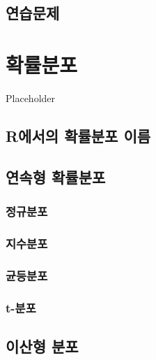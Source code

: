 \documentclass[
]{book}
\begin{document}
\hypertarget{uxc5f0uxc2b5uxbb38uxc81c-4}{%
\section{연습문제}\label{uxc5f0uxc2b5uxbb38uxc81c-4}}

\hypertarget{chapter-distribution}{%
\chapter{확률분포}\label{chapter-distribution}}

Placeholder

\hypertarget{ruxc5d0uxc11cuxc758-uxd655uxb960uxbd84uxd3ec-uxc774uxb984}{%
\section{R에서의 확률분포 이름}\label{ruxc5d0uxc11cuxc758-uxd655uxb960uxbd84uxd3ec-uxc774uxb984}}

\hypertarget{uxc5f0uxc18duxd615-uxd655uxb960uxbd84uxd3ec}{%
\section{연속형 확률분포}\label{uxc5f0uxc18duxd615-uxd655uxb960uxbd84uxd3ec}}

\hypertarget{uxc815uxaddcuxbd84uxd3ec}{%
\subsection{정규분포}\label{uxc815uxaddcuxbd84uxd3ec}}

\hypertarget{uxc9c0uxc218uxbd84uxd3ec}{%
\subsection{지수분포}\label{uxc9c0uxc218uxbd84uxd3ec}}

\hypertarget{uxade0uxb4f1uxbd84uxd3ec}{%
\subsection{균등분포}\label{uxade0uxb4f1uxbd84uxd3ec}}

\hypertarget{t-uxbd84uxd3ec}{%
\subsection{t-분포}\label{t-uxbd84uxd3ec}}

\hypertarget{uxc774uxc0b0uxd615-uxbd84uxd3ec}{%
\section{이산형 분포}\label{uxc774uxc0b0uxd615-uxbd84uxd3ec}}
\end{document}
